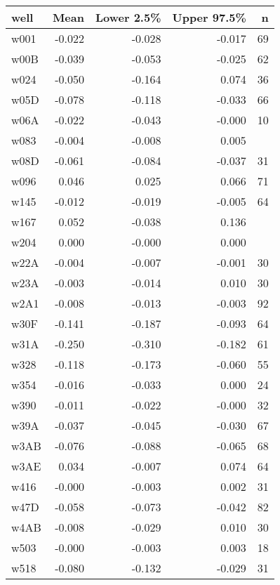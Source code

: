 \begin{table}[ht]
\centering
\begingroup\fontsize{8pt}{2pt}\selectfont
\begin{tabular}{lrrrr}
  \hline
well & Mean & Lower 2.5\% & Upper 97.5\% & n \\ 
  \hline
w001 & -0.022 & -0.028 & -0.017 &   69 \\ 
  w00B & -0.039 & -0.053 & -0.025 &   62 \\ 
  w024 & -0.050 & -0.164 & 0.074 &   36 \\ 
  w05D & -0.078 & -0.118 & -0.033 &   66 \\ 
  w06A & -0.022 & -0.043 & -0.000 &   10 \\ 
  w083 & -0.004 & -0.008 & 0.005 &  \\ 
  w08D & -0.061 & -0.084 & -0.037 &   31 \\ 
  w096 & 0.046 & 0.025 & 0.066 &   71 \\ 
  w145 & -0.012 & -0.019 & -0.005 &   64 \\ 
  w167 & 0.052 & -0.038 & 0.136 &  \\ 
  w204 & 0.000 & -0.000 & 0.000 &  \\ 
  w22A & -0.004 & -0.007 & -0.001 &   30 \\ 
  w23A & -0.003 & -0.014 & 0.010 &   30 \\ 
  w2A1 & -0.008 & -0.013 & -0.003 &   92 \\ 
  w30F & -0.141 & -0.187 & -0.093 &   64 \\ 
  w31A & -0.250 & -0.310 & -0.182 &   61 \\ 
  w328 & -0.118 & -0.173 & -0.060 &   55 \\ 
  w354 & -0.016 & -0.033 & 0.000 &   24 \\ 
  w390 & -0.011 & -0.022 & -0.000 &   32 \\ 
  w39A & -0.037 & -0.045 & -0.030 &   67 \\ 
  w3AB & -0.076 & -0.088 & -0.065 &   68 \\ 
  w3AE & 0.034 & -0.007 & 0.074 &   64 \\ 
  w416 & -0.000 & -0.003 & 0.002 &   31 \\ 
  w47D & -0.058 & -0.073 & -0.042 &   82 \\ 
  w4AB & -0.008 & -0.029 & 0.010 &   30 \\ 
  w503 & -0.000 & -0.003 & 0.003 &   18 \\ 
  w518 & -0.080 & -0.132 & -0.029 &   31 \\ 

\end{tabular}
\end{table}
